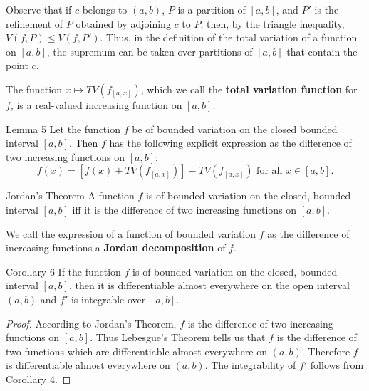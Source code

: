 Observe that if $c$ belongs to $(a,b)$, $P$ is a partition of $[a,b]$, and $P'$ is the refinement of $P$ obtained by adjoining $c$ to $P$, then, by the triangle inequality, $V(f,P)\le V(f,P')$.
Thus, in the definition of the total variation of a function on $[a,b]$, the supremum can be taken over partitions of $[a,b]$ that contain the point $c$.

The function $x\mapsto TV(f_{[a,x]})$, which we call the \textbf{total variation function} for $f$, is a real-valued increasing function on $[a,b]$.
\begin{namedthm*}{Lemma 5}
    Let the function $f$ be of bounded variation on the closed bounded interval $[a,b]$.
    Then $f$ has the following explicit expression as the difference of two increasing functions on $[a,b]$:
    \[
        f(x)=[f(x)+TV(f_{[a,x]})]-TV(f_{[a,x]})\text{ for all }x\in[a,b].
    \]
\end{namedthm*}
\begin{namedthm*}{Jordan's Theorem}
    A function $f$ is of bounded variation on the closed, bounded interval $[a,b]$ iff it is the difference of two increasing functions on $[a,b]$.
\end{namedthm*}
We call the expression of a function of bounded variation $f$ as the difference of increasing functions a \textbf{Jordan decomposition} of $f$.
\begin{namedthm*}{Corollary 6}
    If the function $f$ is of bounded variation on the closed, bounded interval $[a,b]$, then it is differentiable almost everywhere on the open interval $(a,b)$ and $f'$ is integrable over $[a,b]$.
\end{namedthm*}
\begin{proof}
    According to Jordan's Theorem, $f$ is the difference of two increasing functions on $[a,b]$.
    Thus Lebesgue's Theorem tells us that $f$ is the difference of two functions which are differentiable almost everywhere on $(a,b)$.
    Therefore $f$ is differentiable almost everywhere on $(a,b)$.
    The integrability of $f'$ follows from Corollary 4.
\end{proof}

